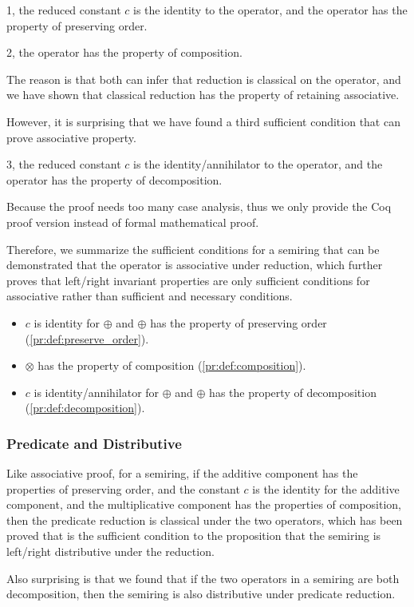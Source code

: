 \documentclass[a4paper,10pt]{article}
\begin{document}
1, the reduced constant $c$ is the identity to the operator, and the operator has the property of preserving order.

2, the operator has the property of composition.

The reason is that both can infer that reduction is classical on the operator, and we have shown that classical reduction has the property of retaining associative.

However, it is surprising that we have found a third sufficient condition that can prove associative property.

3, the reduced constant $c$ is the identity/annihilator to the operator, and the operator has the property of decomposition.

Because the proof needs too many case analysis, thus we only provide the Coq proof version instead of formal mathematical proof.

Therefore, we summarize the sufficient conditions for a semiring that can be demonstrated that the operator is associative under reduction, which further proves that left/right invariant properties are only sufficient conditions for associative rather than sufficient and necessary conditions.
\begin{itemize}
  \item $c$ is identity for $\oplus$ and $\oplus$ has the property of preserving order (\ref{pr:def:preserve_order}).
  \item $\otimes$ has the property of composition (\ref{pr:def:composition}).
  \item $c$ is identity/annihilator for $\oplus$ and $\oplus$ has the property of decomposition (\ref{pr:def:decomposition}).
\end{itemize}
\subsubsection{Predicate and Distributive}
Like associative proof, for a semiring,  if the additive component has the properties of preserving order, and the constant $c$ is the identity for the additive component, and the multiplicative component has the properties of composition, then the predicate reduction is classical under the two operators, which has been proved that is the sufficient condition to the proposition that the semiring is left/right distributive under the reduction.

Also surprising is that we found that if the two operators in a semiring are both decomposition, then the semiring is also distributive under predicate reduction.
\end{document}

